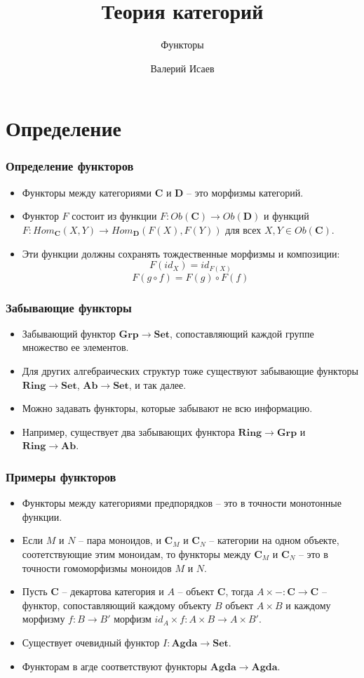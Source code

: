 \documentclass{beamer}
\theoremstyle{definition}
\newcommand{\cat}[1]{\mathbf{#1}}
\renewcommand{\C}{\cat{C}}
\newcommand{\D}{\cat{D}}
\newcommand{\Set}{\cat{Set}}
\newcommand{\Grp}{\cat{Grp}}
\newcommand{\Ab}{\cat{Ab}}
\newcommand{\Ring}{\cat{Ring}}
\newcommand{\Agda}{\cat{Agda}}
\begin{document}
\title{Теория категорий}
\subtitle{Функторы}
\author{Валерий Исаев}
\maketitle

\section{Определение}

\begin{frame}
\frametitle{Определение функторов}
\begin{itemize}
\item Функторы между категориями $\C$ и $\D$ -- это морфизмы категорий.
\item Функтор $F$ состоит из функции $F : Ob(\C) \to Ob(\D)$ и функций $F : Hom_\C(X, Y) \to Hom_\D(F(X), F(Y))$ для всех $X, Y \in Ob(\C)$.
\item Эти функции должны сохранять тождественные морфизмы и композиции:
\[ F(id_X) = id_{F(X)} \]
\[ F(g \circ f) = F(g) \circ F(f) \]
\end{itemize}
\end{frame}

\begin{frame}
\frametitle{Забывающие функторы}
\begin{itemize}
\item Забывающий функтор $\Grp \to \Set$, сопоставляющий каждой группе множество ее элементов.
\item Для других алгебраических структур тоже существуют забывающие функторы $\Ring \to \Set$, $\Ab \to \Set$, и так далее.
\item Можно задавать функторы, которые забывают не всю информацию.
\item Например, существует два забывающих функтора $\Ring \to \Grp$ и $\Ring \to \Ab$.
\end{itemize}
\end{frame}

\begin{frame}
\frametitle{Примеры функторов}
\begin{itemize}
\item Функторы между категориями предпорядков -- это в точности монотонные функции.
\item Если $M$ и $N$ -- пара моноидов, и $\C_M$ и $\C_N$ -- категории на одном объекте, соотетствующие этим моноидам, то функторы между $\C_M$ и $\C_N$ -- это в точности гомоморфизмы моноидов $M$ и $N$.
\item Пусть $\C$ -- декартова категория и $A$ -- объект $\C$, тогда $A \times - : \C \to \C$ -- функтор, сопоставляющий каждому объекту $B$ объект $A \times B$ и каждому морфизму $f : B \to B'$ морфизм $id_A \times f : A \times B \to A \times B'$.
\item Существует очевидный функтор $I : \Agda \to \Set$.
\item Функторам в агде соответствуют функторы $\Agda \to \Agda$.
\end{itemize}
\end{frame}
\end{document}
